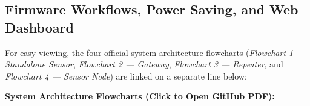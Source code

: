 \documentclass[conference,onecolumn]{IEEEtran}
\begin{document}
\subsection{Firmware Workflows, Power Saving, and Web Dashboard}
For easy viewing, the four official system architecture flowcharts (\textit{Flowchart 1 --- Standalone Sensor}, \textit{Flowchart 2 --- Gateway}, \textit{Flowchart 3 --- Repeater}, and \textit{Flowchart 4 --- Sensor Node}) are linked on a separate line below:

\smallskip
{\textbf{System Architecture Flowcharts (Click to Open GitHub PDF):}}\\
\noindent\href{https://github.com/iimarky1234/LoRa-Weather-Station/blob/baaa71d1f1d5a8bfd5d371a7b0f6451495bd53da/docs/FlowChart/System\%20Architecture\%20Flowcharts.pdf}{\resizebox{0.96\linewidth}{!}{\textbf{\flowcharturl}}}
\smallskip
\end{document}
